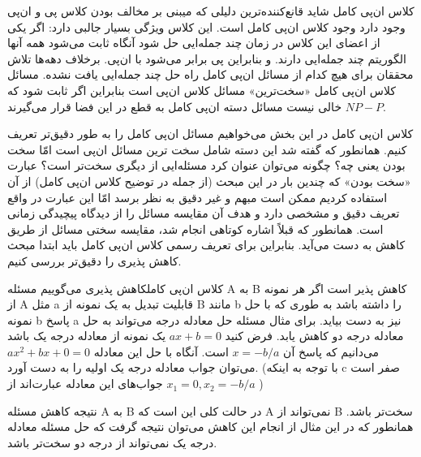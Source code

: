 \begin{itemframe}{کلاس ان‌پی کامل}
\itm
شاید قانع‌کننده‌ترین دلیلی که میبنی بر مخالف بودن کلاس پی و ان‌پی وجود دارد وجود کلاس ان‌پی کامل است. این کلاس ویژگی بسیار جالبی دارد: اگر یکی از اعضای این کلاس در زمان چند جمله‌ایی حل شود آنگاه ثابت می‌شود همه آنها الگوریتم چند جمله‌ایی دارند. و بنابراین پی برابر می‌شود با ان‌پی.
\itm
برخلاف دهه‌ها تلاش محققان برای هیچ کدام از مسائل ان‌پی کامل راه حل چند جمله‌ایی یافت نشده.
\itm
مسائل کلاس ان‌پی کامل «سخت‌ترین» مسائل کلاس ان‌پی است بنابراین اگر ثابت شود که
$NP - P$
خالی نیست مسائل دسته ان‌پی کامل به قطع در این فضا قرار می‌گیرند.

\end{itemframe}

\begin{itemframe}{کلاس ان‌پی کامل}
\itm
در این بخش می‌خواهیم مسائل ان‌پی کامل را به طور دقیق‌تر تعریف کنیم. همانطور که گفته شد این دسته شامل سخت ترین مسائل ان‌پی است امّا سخت بودن یعنی چه؟ چگونه می‌توان عنوان کرد مسئله‌ایی از دیگری سخت‌تر است؟
\itm
عبارت «سخت‌ بودن»
که چندین بار در این مبحث (از جمله در توضیح کلاس ان‌پی کامل) از آن استفاده کردیم ممکن است مبهم و غیر دقیق به نظر برسد امّا این عبارت در واقع تعریف دقیق و مشخصی دارد و هدف آن مقایسه مسائل را از دیدگاه پیچیدگی زمانی است.
\itm
همانطور که قبلاً اشاره کوتاهی انجام شد، مقایسه سختی مسائل  از طریق کاهش به دست می‌آید. بنابراین برای تعریف رسمی کلاس ان‌پی کامل باید ابتدا مبحث کاهش پذیری را دقیق‌تر بررسی کنیم.
\end{itemframe}

\begin{itemframe-s}{کلاس ان‌پی کامل}{کاهش پذیری}
\itm
می‌گوییم مسئله A به B کاهش پذیر
 است اگر هر نمونه از A مثل a قابلیت تبدیل به یک نمونه از B مانند b را داشته باشد به طوری که با حل نمونه b پاسخ a نیز به دست بیاید.
\itm
برای مثال مسئله حل معادله درجه می‌تواند به حل معادله درجه دو کاهش یابد. فرض کنید $ax+b=0$ یک نمونه از معادله درجه یک باشد می‌دانیم که پاسخ آن
$ x = -b/a $
است.
آنگاه با حل این معادله $ ax^2+bx+0=0 $ می‌توان جواب معادله درجه یک اولیه را به دست آورد. (با توجه به اینکه c صفر است جواب‌های این معادله عبارت‌اند از
$ x_1 = 0, x_2= -b/a $
)

\itm
نتیجه کاهش مسئله A به B در حالت کلی این است که A نمی‌تواند از B سخت‌تر باشد. همانطور که در این مثال از انجام این کاهش می‌توان نتیجه گرفت که حل مسئله معادله درجه یک نمی‌تواند از درجه دو سخت‌تر باشد.
\end{itemframe-s}

